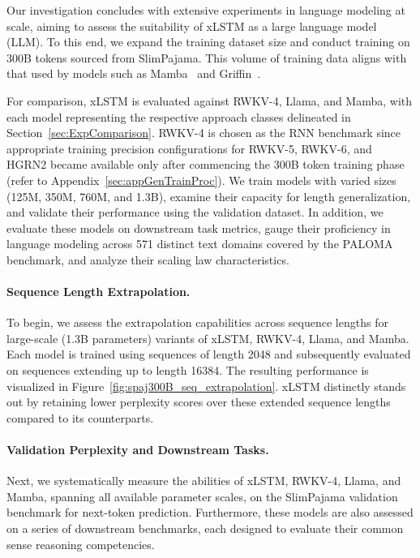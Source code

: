 Our investigation concludes with extensive experiments in language modeling at scale, aiming to assess the suitability of xLSTM as a large language model (LLM). To this end, we expand the training dataset size and conduct training on 300B tokens sourced from SlimPajama. This volume of training data aligns with that used by models such as Mamba~\citep{Gu:24arxiv} and Griffin~\citep{De:24arxiv}.

For comparison, xLSTM is evaluated against RWKV-4, Llama, and Mamba, with each model representing the respective approach classes delineated in Section~\ref{sec:ExpComparison}.
RWKV-4 is chosen as the RNN benchmark since appropriate training precision configurations for RWKV-5, RWKV-6, and HGRN2 became available only after commencing the 300B token training phase (refer to Appendix~\ref{sec:appGenTrainProc}).
We train models with varied sizes (125M, 350M, 760M, and 1.3B), examine their capacity for length generalization, and validate their performance using the validation dataset. In addition, we evaluate these models on downstream task metrics, gauge their proficiency in language modeling across 571 distinct text domains covered by the PALOMA benchmark, and analyze their scaling law characteristics.

\paragraph{Sequence Length Extrapolation.}
\label{sec:spaj300B_ctx_extrapolation}
To begin, we assess the extrapolation capabilities across sequence lengths for large-scale (1.3B parameters) variants of xLSTM, RWKV-4, Llama, and Mamba. Each model is trained using sequences of length 2048 and subsequently evaluated on sequences extending up to length 16384. The resulting performance is visualized in Figure~\ref{fig:spaj300B_seq_extrapolation}. xLSTM distinctly stands out by retaining lower perplexity scores over these extended sequence lengths compared to its counterparts.

\paragraph{Validation Perplexity and Downstream Tasks.}
\label{sec:spaj_downstream_eval}
Next, we systematically measure the abilities of xLSTM, RWKV-4, Llama, and Mamba, spanning all available parameter scales, on the SlimPajama validation benchmark for next-token prediction. Furthermore, these models are also assessed on a series of downstream benchmarks, each designed to evaluate their common sense reasoning competencies.

